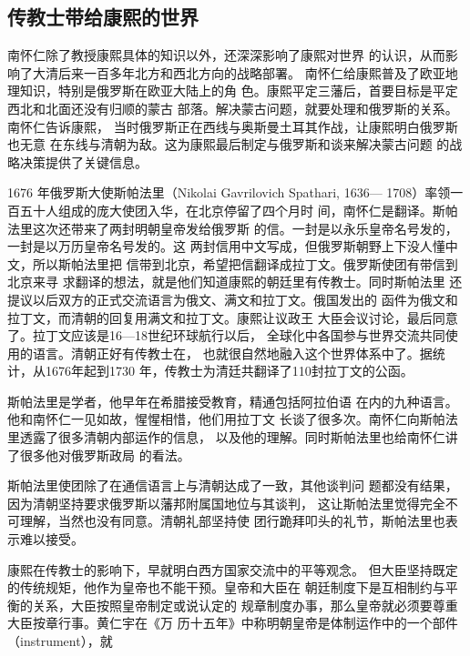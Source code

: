 \subsection{传教士带给康熙的世界}
\par
南怀仁除了教授康熙具体的知识以外，还深深影响了康熙对世界%
的认识，从而影响了大清后来一百多年北方和西北方向的战略部署。%
南怀仁给康熙普及了欧亚地理知识，特别是俄罗斯在欧亚大陆上的角%
色。康熙平定三藩后，首要目标是平定西北和北面还没有归顺的蒙古%
部落。解决蒙古问题，就要处理和俄罗斯的关系。南怀仁告诉康熙，%
当时俄罗斯正在西线与奥斯曼土耳其作战，让康熙明白俄罗斯也无意%
在东线与清朝为敌。这为康熙最后制定与俄罗斯和谈来解决蒙古问题%
的战略决策提供了关键信息。%
\par
1676 年俄罗斯大使斯帕法里（Nikolai Gavrilovich Spathari, 1636—%
1708）率领一百五十人组成的庞大使团入华，在北京停留了四个月时%
间，南怀仁是翻译。斯帕法里这次还带来了两封明朝皇帝发给俄罗斯%
的信。一封是以永乐皇帝名号发的，一封是以万历皇帝名号发的。这%
两封信用中文写成，但俄罗斯朝野上下没人懂中文，所以斯帕法里把%
信带到北京，希望把信翻译成拉丁文。俄罗斯使团有带信到北京来寻%
求翻译的想法，就是他们知道康熙的朝廷里有传教士。同时斯帕法里%
还提议以后双方的正式交流语言为俄文、满文和拉丁文。俄国发出的%
函件为俄文和拉丁文，而清朝的回复用满文和拉丁文。康熙让议政王%
大臣会议讨论，最后同意了。拉丁文应该是16—18世纪环球航行以后，%
全球化中各国参与世界交流共同使用的语言。清朝正好有传教士在，%
也就很自然地融入这个世界体系中了。据统计，从1676年起到1730%
年，传教士为清廷共翻译了110封拉丁文的公函。%
\par
斯帕法里是学者，他早年在希腊接受教育，精通包括阿拉伯语%
在内的九种语言。他和南怀仁一见如故，惺惺相惜，他们用拉丁文%
长谈了很多次。南怀仁向斯帕法里透露了很多清朝内部运作的信息，%
以及他的理解。同时斯帕法里也给南怀仁讲了很多他对俄罗斯政局%
的看法。%
\par
斯帕法里使团除了在通信语言上与清朝达成了一致，其他谈判问%
题都没有结果，因为清朝坚持要求俄罗斯以藩邦附属国地位与其谈判，%
这让斯帕法里觉得完全不可理解，当然也没有同意。清朝礼部坚持使%
团行跪拜叩头的礼节，斯帕法里也表示难以接受。%
\par
康熙在传教士的影响下，早就明白西方国家交流中的平等观念。%
但大臣坚持既定的传统规矩，他作为皇帝也不能干预。皇帝和大臣在%
朝廷制度下是互相制约与平衡的关系，大臣按照皇帝制定或说认定的%
规章制度办事，那么皇帝就必须要尊重大臣按章行事。黄仁宇在《万%
历十五年》中称明朝皇帝是体制运作中的一个部件（instrument），就%
